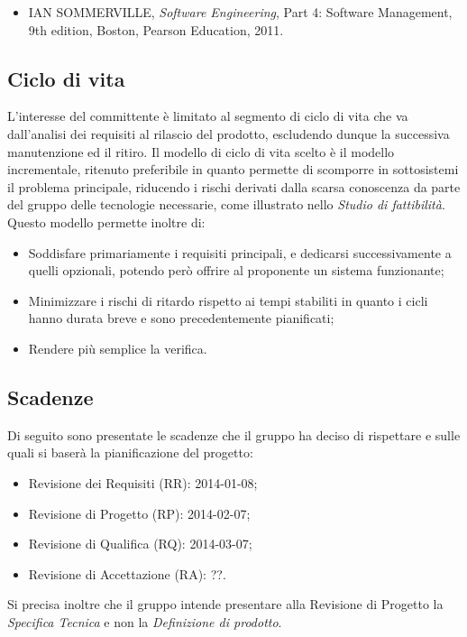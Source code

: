 		\begin{itemize}
		\item IAN SOMMERVILLE, \textit{Software Engineering}, Part 4: Software Management, 9th edition, Boston, Pearson Education, 2011.
		\end{itemize}
		
	\subsection{Ciclo di vita}
	L'interesse del committente è limitato al segmento di ciclo di vita che va dall'analisi dei requisiti al rilascio del prodotto, escludendo dunque la successiva manutenzione ed il ritiro.
	Il modello di ciclo di vita scelto è il modello incrementale, ritenuto preferibile in quanto permette di scomporre in sottosistemi il problema principale, riducendo i rischi derivati dalla scarsa conoscenza da parte del gruppo delle tecnologie necessarie, come illustrato nello \textit{Studio di fattibilità}.
	Questo modello permette inoltre di:
	\begin{itemize}
	\item Soddisfare primariamente i requisiti principali, e dedicarsi successivamente a quelli opzionali, potendo però offrire al proponente un sistema funzionante;
	\item Minimizzare i rischi di ritardo rispetto ai tempi stabiliti in quanto i cicli hanno durata breve e sono precedentemente pianificati;
	\item Rendere più semplice la verifica.
	\end{itemize}
	\subsection{Scadenze}
	Di seguito sono presentate le scadenze che il gruppo ha deciso di rispettare e sulle quali si baserà la pianificazione del progetto:
	\begin{itemize}
	\item Revisione dei Requisiti (RR): 2014-01-08;
	\item Revisione di Progetto (RP): 2014-02-07;
	\item Revisione di Qualifica (RQ): 2014-03-07;
	\item Revisione di Accettazione (RA): ??.
	\end{itemize}
	Si precisa inoltre che il gruppo intende presentare alla Revisione di Progetto la \textit{Specifica Tecnica} e non la \textit{Definizione di prodotto}.
